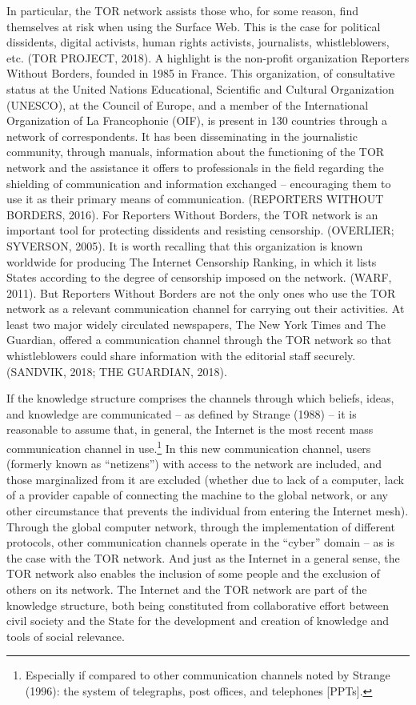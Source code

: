 In particular, the TOR network assists those who, for some reason, find themselves at risk when using the Surface Web. This is the case for political dissidents, digital activists, human rights activists, journalists, whistleblowers, etc. (TOR PROJECT, 2018). A highlight is the non-profit organization Reporters Without Borders, founded in 1985 in France. This organization, of consultative status at the United Nations Educational, Scientific and Cultural Organization (UNESCO), at the Council of Europe, and a member of the International Organization of La Francophonie (OIF), is present in 130 countries through a network of correspondents. It has been disseminating in the journalistic community, through manuals, information about the functioning of the TOR network and the assistance it offers to professionals in the field regarding the shielding of communication and information exchanged -- encouraging them to use it as their primary means of communication. (REPORTERS WITHOUT BORDERS, 2016). For Reporters Without Borders, the TOR network is an important tool for protecting dissidents and resisting censorship. (OVERLIER; SYVERSON, 2005). It is worth recalling that this organization is known worldwide for producing The Internet Censorship Ranking, in which it lists States according to the degree of censorship imposed on the network. (WARF, 2011). But Reporters Without Borders are not the only ones who use the TOR network as a relevant communication channel for carrying out their activities. At least two major widely circulated newspapers, The New York Times and The Guardian, offered a communication channel through the TOR network so that whistleblowers could share information with the editorial staff securely. (SANDVIK, 2018; THE GUARDIAN, 2018).

If the knowledge structure comprises the channels through which beliefs, ideas, and knowledge are communicated -- as defined by Strange (1988) -- it is reasonable to assume that, in general, the Internet is the most recent mass communication channel in use.\footnote{Especially if compared to other communication channels noted by Strange (1996): the system of telegraphs, post offices, and telephones {[}PPTs{]}.} In this new communication channel, users (formerly known as ``netizens'') with access to the network are included, and those marginalized from it are excluded (whether due to lack of a computer, lack of a provider capable of connecting the machine to the global network, or any other circumstance that prevents the individual from entering the Internet mesh). Through the global computer network, through the implementation of different protocols, other communication channels operate in the ``cyber'' domain -- as is the case with the TOR network. And just as the Internet in a general sense, the TOR network also enables the inclusion of some people and the exclusion of others on its network. The Internet and the TOR network are part of the knowledge structure, both being constituted from collaborative effort between civil society and the State for the development and creation of knowledge and tools of social relevance.

